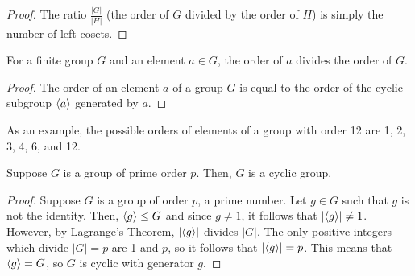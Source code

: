 \documentclass[letterpaper]{article}
\begin{document}
\begin{mdframed}
    \begin{proof}
        The ratio $\frac{|G|}{|H|}$ (the order of $G$ divided by the order of $H$) is simply the number of left cosets. 
    \end{proof}
\end{mdframed}

\begin{corollary}{}{}
    For a finite group $G$ and an element $a \in G$, the order of $a$ divides the order of $G$.
\end{corollary}

\begin{mdframed}
    \begin{proof}
        The order of an element $a$ of a group $G$ is equal to the order of the cyclic subgroup $\langle a \rangle$ generated by $a$. 
    \end{proof}
\end{mdframed}
As an example, the possible orders of elements of a group with order 12 are 1, 2, 3, 4, 6, and 12. 

\begin{corollary}{}{}
    Suppose $G$ is a group of prime order $p$. Then, $G$ is a cyclic group. 
\end{corollary}

\begin{mdframed}
    \begin{proof}
        Suppose $G$ is a group of order $p$, a prime number. Let $g \in G$ such that $g$ is not the identity. Then, $\langle g \rangle \leq G$ and since $g \neq 1$, it follows that $|\langle g \rangle| \neq 1$. However, by Lagrange's Theorem, $|\langle g \rangle|$ divides $|G|$. The only positive integers which divide $|G| = p$ are 1 and $p$, so it follows that $|\langle g \rangle| = p$. This means that $\langle g \rangle = G$, so $G$ is cyclic with generator $g$.  
    \end{proof}
\end{mdframed}
\end{document}
